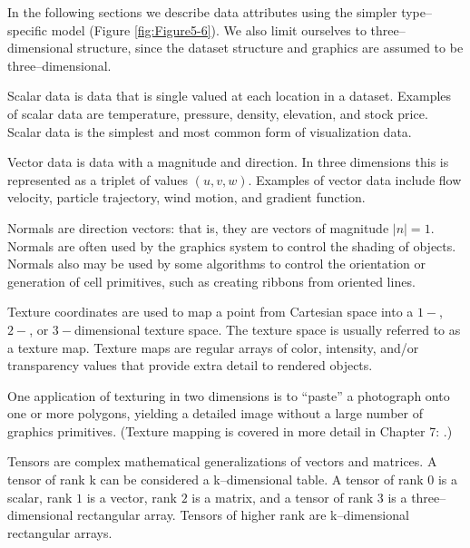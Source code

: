 In the following sections we describe data attributes using the simpler type--specific model (Figure \ref{fig:Figure5-6}). We also limit ourselves to three--dimensional structure, since the dataset structure and graphics are assumed to be three--dimensional.

\begin{description}[leftmargin=0cm,labelindent=0cm]

\item[Scalars.\index{dataset attributes!scalars}\index{scalar}\index{scalar attributes}] Scalar data is data that is single valued at each location in a dataset. Examples of scalar data are temperature, pressure, density, elevation, and stock price. Scalar data is the simplest and most common form of visualization data.

\item[Vectors.\index{dataset attributes!vectors}] Vector data is data with a magnitude and direction. In three dimensions this is represented as a triplet of values $(u, v, w)$. Examples of vector data include flow velocity, particle trajectory, wind motion, and gradient function.

\item[Normals.\index{dataset attributes!normals}\index{normal}\index{normal attributes}] Normals are direction vectors: that is, they are vectors of magnitude $|n|=1$. Normals are often used by the graphics system to control the shading of objects. Normals also may be used by some algorithms to control the orientation or generation of cell primitives, such as creating ribbons from oriented lines.

\item[Texture Coordinates.\index{dataset attributes!texture coordinates}\index{texture coordinate}\index{texture coordinate!attributes}] Texture coordinates are used to map a point from Cartesian space into a $1-$, $2-$, or $3-$dimensional texture space. The texture space is usually referred to as a texture map. Texture maps are regular arrays of color, intensity, and/or transparency values that provide extra detail to rendered objects.

One application of texturing in two dimensions is to ``paste'' a photograph onto one or more polygons, yielding a detailed image without a large number of graphics primitives. (Texture mapping is covered in more detail in Chapter 7:  .)

\item[Tensors.\index{dataset attributes!tensors}\index{tensor attributes}] Tensors are complex mathematical generalizations of vectors and matrices. A tensor of rank k can be considered a k--dimensional table. A tensor of rank $0$ is a scalar, rank $1$ is a vector, rank $2$ is a matrix, and a tensor of rank $3$ is a three--dimensional rectangular array. Tensors of higher rank are k--dimensional rectangular arrays.


\end{description}

